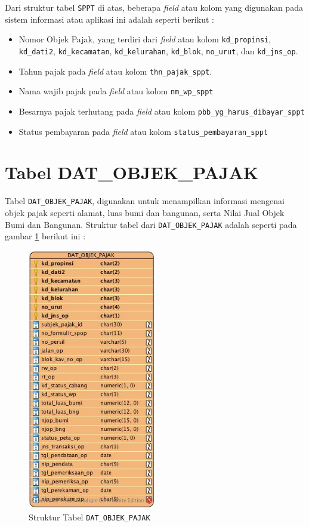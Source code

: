 Dari struktur tabel \texttt{SPPT} di atas, beberapa \textit{field} atau kolom yang digunakan pada sistem informasi atau aplikasi ini adalah seperti berikut :

\begin{itemize}
	\item Nomor Objek Pajak, yang terdiri dari \textit{field} atau kolom \texttt{kd\_propinsi}, \texttt{kd\_dati2}, \texttt{kd\_kecamatan}, \texttt{kd\_kelurahan}, \texttt{kd\_blok}, \texttt{no\_urut}, dan \texttt{kd\_jns\_op}.
	\item Tahun pajak pada \textit{field} atau kolom \texttt{thn\_pajak\_sppt}.
	\item Nama wajib pajak pada \textit{field} atau kolom \texttt{nm\_wp\_sppt}
	\item Besarnya pajak terhutang pada \textit{field} atau kolom \texttt{pbb\_yg\_harus\_dibayar\_sppt}
	\item Status pembayaran pada \textit{field} atau kolom \texttt{status\_pembayaran\_sppt}
\end{itemize}

\section{Tabel DAT\_OBJEK\_PAJAK}

Tabel \texttt{DAT\_OBJEK\_PAJAK}, digunakan untuk menampilkan informasi mengenai objek pajak seperti alamat, luas bumi dan bangunan, serta Nilai Jual Objek Bumi dan Bangunan. Struktur tabel dari \texttt{DAT\_OBJEK\_PAJAK} adalah seperti pada gambar \ref{fig:struktur-dat-op} berikut ini :

\begin{figure}[H]
	\centering
	\includegraphics[width=0.5\textwidth]{./resources/struktur-tabel-dat-op}
	\caption{Struktur Tabel \texttt{DAT\_OBJEK\_PAJAK}}
	\label{fig:struktur-dat-op}
\end{figure}

